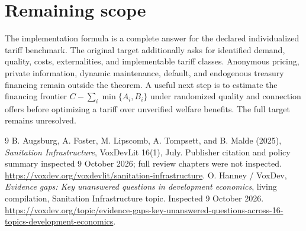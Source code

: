 \documentclass[11pt]{article}
\theoremstyle{remark}
\begin{document}
\section{Remaining scope}
The implementation formula is a complete answer for the declared individualized tariff benchmark. The original target additionally asks for identified demand, quality, costs, externalities, and implementable tariff classes. Anonymous pricing, private information, dynamic maintenance, default, and endogenous treasury financing remain outside the theorem. A useful next step is to estimate the financing frontier $C-\sum_i\min\{A_i,B_i\}$ under randomized quality and connection offers before optimizing a tariff over unverified welfare benefits. The full target remains unresolved.

\begin{thebibliography}{9}
 B. Augsburg, A. Foster, M. Lipscomb, A. Tompsett, and B. Malde (2025), \emph{Sanitation Infrastructure}, VoxDevLit 16(1), July. Publisher citation and policy summary inspected 9 October 2026; full review chapters were not inspected. \url{https://voxdev.org/voxdevlit/sanitation-infrastructure}.
 O. Hanney / VoxDev, \emph{Evidence gaps: Key unanswered questions in development economics}, living compilation, Sanitation Infrastructure topic. Inspected 9 October 2026. \url{https://voxdev.org/topic/evidence-gaps-key-unanswered-questions-across-16-topics-development-economics}.
\end{thebibliography}
\end{document}
